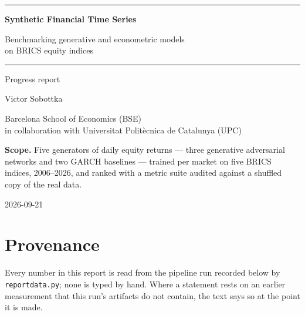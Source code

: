 \documentclass[11pt,a4paper]{article}
\makeatletter
\DeclareRobustCommand{\_}{\ifmmode\nfss@text{\textunderscore}\else\textunderscore\allowbreak\fi}
\makeatother
\begin{document}
\begin{titlepage}
\thispagestyle{empty}
\setlength{\parindent}{0pt}

\vspace*{3.2cm}
{\sffamily\color{Accent}\rule{\linewidth}{0.8pt}\par\vspace{0.9cm}
{\fontsize{30}{36}\selectfont\bfseries Synthetic Financial Time Series\par}
\vspace{0.5cm}
{\LARGE Benchmarking generative and econometric models\\[2pt] on BRICS equity indices\par}
\vspace{0.9cm}\rule{\linewidth}{0.8pt}\par}
\vspace{0.9cm}
{\sffamily\Large Progress report\par}
\vspace{2.6cm}
{\large Victor Sobottka\par}
\vspace{0.3cm}
{\normalsize Barcelona School of Economics (BSE)\\ in collaboration with Universitat Polit\`ecnica de Catalunya (UPC)\par}
\vfill
{\sffamily\small\textbf{Scope.} Five generators of daily equity returns --- three generative adversarial networks and two GARCH baselines --- trained per market on five BRICS indices, 2006--2026, and ranked with a metric suite audited against a shuffled copy of the real data.\par}
\vspace{0.7cm}
{\sffamily\small 2026-09-21\par}
\end{titlepage}
\setcounter{page}{2}

\tableofcontents
\clearpage

\section*{Provenance}
\label{sec:provenance}
Every number in this report is read from the pipeline run recorded below by \texttt{report\_data.py}; none is typed by hand. Where a statement rests on an earlier measurement that this run's artifacts do not contain, the text says so at the point it is made.
\end{document}
